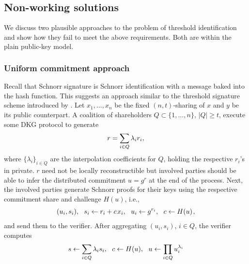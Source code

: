 \documentclass{iacrtrans}
\begin{document}
\subsection{Non-working solutions}\label{section_non_working_solutions}

We discuss two plausible approaches to the
problem of threshold identification
and show how they fail to meet
the above requirements.
Both are within the plain public-key model.

\subsubsection{Uniform commitment approach}\label{section_uniform_commitment}

Recall that Schnorr signature is
Schnorr identification with a message baked
into the hash function.
This suggests an approach similar to the
threshold signature scheme introduced
by \cite{paper_stinson_strobl}.
Let $x_1, \dots, x_n$ be the fixed
$(n,t)$-sharing of $x$ and $y$ be its public counterpart.
A coalition of shareholders $Q \subset \{1, \dots, n\}$,
$|Q| \ge t$, execute some DKG protocol to generate
\vspace{5pt}
\begin{equation*}
r = \sum_{i \in Q} \lambda_i r_i,
\vspace{5pt}
\end{equation*}
where $\{\lambda_i\}_{i \in Q}$
are the interpolation coefficients
for $Q$, holding the respective $r_i$'s in private.
$r$ need not be locally reconstructible
but involved parties should be able to
infer the distributed commitment
$u = g^r$ at the end of the process.
Next, the involved parties generate Schnorr proofs
for their keys using the respective commitment share
and challenge $H(u)$, i.e.,
\vspace{5pt}
\begin{equation*}
(u_i, s_i),
\ \ s_i \leftarrow r_i + c\hspace{1pt}x_i,
\ \ u_i \leftarrow g ^ {r_i},
\ \ c \leftarrow H(u)
\hspace{1pt},
\vspace{5pt}
\end{equation*}
and send them to the verifier. 
After aggregating $(u_i, s_i)$, $i \in Q$,
the verifier computes
\vspace{5pt}
\begin{equation*}
s \leftarrow \sum_{i \in Q} \lambda_i s_i,
\ \ c \leftarrow H(u),
\ \ u \leftarrow \prod_{i \in Q} u_i ^ {\lambda_i}
\vspace{5pt}
\end{equation*}
\end{document}
